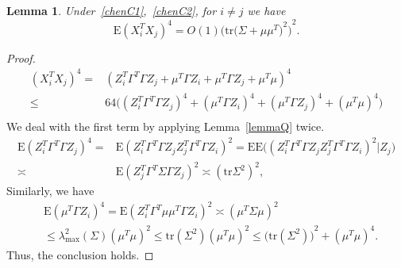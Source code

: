 \documentclass[review]{elsarticle}
\theoremstyle{plain}
\newtheorem{lemma}{Lemma}
\theoremstyle{definition}
\theoremstyle{remark}
\begin{document}
\begin{lemma}\label{smallLemma1}
    Under~\eqref{chenC1},~\eqref{chenC2}, for $i\neq j$ we have
    \begin{equation}\label{eq:20170220}
        \mathrm{E}{(X_i^T X_j)}^4=%
             O(1){\Big(\mathrm{tr}{\big(\Sigma+\mu\mu^T\big)}^2\Big)}^2.
    \end{equation}
\end{lemma}
\begin{proof}
    $$
        \begin{aligned}
            {(X_i^T X_j)}^4=&
            {(Z_i^T \Gamma^T \Gamma Z_j+\mu^T \Gamma Z_i+\mu^T \Gamma Z_j+\mu^T \mu)}^4\\
            \leq &
            64\big((Z_i^T \Gamma^T \Gamma Z_j)^4+(\mu^T \Gamma Z_i)^4+(\mu^T \Gamma Z_j)^4+(\mu^T \mu)^4\big)\\
        \end{aligned}
    $$
    We deal with the first term by applying Lemma~\ref{lemmaQ} twice.
        $$
        \begin{aligned}
            \mathrm{E}(Z_i^T \Gamma^T \Gamma Z_j)^4=&
        \mathrm{E}(Z_i^T \Gamma^T \Gamma Z_j Z_j^T \Gamma^T \Gamma Z_i)^2
            =
            \mathrm{E}\mathrm{E}\big((Z_i^T \Gamma^T \Gamma Z_j Z_j^T \Gamma^T \Gamma Z_i)^2 | Z_j\big)\\
            \asymp &  \mathrm{E}{(Z_j^T \Gamma^T \Sigma \Gamma Z_j)}^2
            \asymp   {(\mathrm{tr}\Sigma^2)}^2,%
        \end{aligned}
    $$
    Similarly, we have
        $$
        \begin{aligned}
            &\mathrm{E}(\mu^T \Gamma Z_i)^4=
        \mathrm{E}(Z_i^T \Gamma^T \mu\mu^T \Gamma Z_i)^2
            \asymp  {(\mu^T \Sigma \mu)}^2\\
            &\leq \lambda_{\max}^2(\Sigma){(\mu^T \mu)}^2
        \leq \mathrm{tr}(\Sigma^2){(\mu^T \mu)}^2
            \leq {\big(\mathrm{tr}(\Sigma^2)\big)}^2+{(\mu^T \mu)}^4.
        \end{aligned}
    $$
    Thus, the conclusion holds.
\end{proof}
\end{document}
